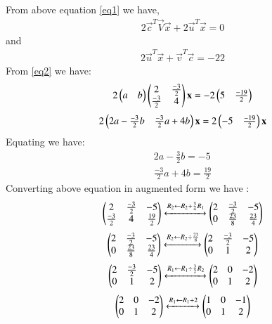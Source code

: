 \documentclass[journal,12pt,twocolumn]{IEEEtran}
\begin{document}
From above equation \eqref{eq1} we have,
\begin{align}\label{eq2}
2\vec{c}^T\vec{V}\vec{x}+2\vec{u}^T\vec{x}=0
\end{align}
and
\begin{align}
2\vec{u}^T\vec{x}+\vec{v}^T\vec{c}=-22
\end{align}
From \eqref{eq2} we have:
\begin{align}
 2\begin{pmatrix}{a} &{b}\end{pmatrix} \begin{pmatrix}2 & \frac{-3}{2} \\\frac{-3}{2} &4\end{pmatrix}\mathbf{x}=-2\begin{pmatrix}5 &\frac{-19}{2}  \end{pmatrix}
\end{align}
\begin{align}
 2\begin{pmatrix}2{a}-\frac{-3}{2} {b}&\frac{-3}{2}{a} + 4{b}\end{pmatrix}\mathbf{x}=2\begin{pmatrix}-5 &\frac{-19}{2}\end{pmatrix}\mathbf{x}
\end{align}
Equating we have:
\begin{align}
 2{a}-\frac{3}{2}{b}=-5 \\
 \frac{-3}{2}{a} +4{b}=\frac{19}{2}
\end{align}
Converting above equation in augmented form we have :
\begin{align}
\begin{pmatrix}
2&  \frac{-3}{2}& -5\\
\frac{-3}{2}& 4&\frac{19}{2}
\end{pmatrix}
  \xleftrightarrow[]{R_2 \leftarrow R_2+\frac{3}{4}R_1}
\begin{pmatrix}
2& \frac{-3}{2}& -5\\
0 & \frac{23}{8} & \frac{23}{4}\\
\end{pmatrix}
\end{align}
\begin{align}
\begin{pmatrix}
2& \frac{-3}{2}& -5\\
0 & \frac{23}{8} & \frac{23}{4}\\
\end{pmatrix}
  \xleftrightarrow[]{R_2 \leftarrow R_2\div \frac{23}{8}}
\begin{pmatrix}
2& \frac{-3}{2}& -5\\
0 & 1 & 2\end{pmatrix}\\
\end{align}
\begin{align}
\begin{pmatrix}
2& \frac{-3}{2}& -5\\
0 & 1 & 2\end{pmatrix}
  \xleftrightarrow[]{R_1 \leftarrow R_1\div \frac{3}{2}R_2}
\begin{pmatrix}
2& 0& -2\\
0 & 1 & 2\end{pmatrix}\\
\end{align}
\begin{align}
\begin{pmatrix}
2& 0& -2\\
0 & 1 & 2\end{pmatrix}
  \xleftrightarrow[]{R_1 \leftarrow R_1\div 2}
\begin{pmatrix}
1& 0& -1\\
0 & 1 & 2\end{pmatrix}
\end{align}
\end{document}
